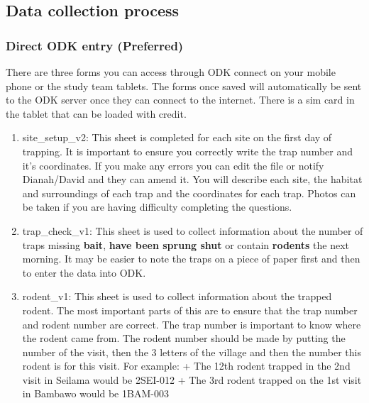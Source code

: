 \documentclass[
]{article}
\providecommand{\tightlist}{%
  \setlength{\itemsep}{0pt}\setlength{\parskip}{0pt}}
\begin{document}
\hypertarget{data-collection-process}{%
\subsection{Data collection process}\label{data-collection-process}}

\hypertarget{direct-odk-entry-preferred}{%
\subsubsection{\texorpdfstring{Direct ODK entry
\textbf{(Preferred)}}{Direct ODK entry (Preferred)}}\label{direct-odk-entry-preferred}}

There are three forms you can access through ODK connect on your mobile
phone or the study team tablets. The forms once saved will automatically
be sent to the ODK server once they can connect to the internet. There
is a sim card in the tablet that can be loaded with credit.

\begin{enumerate}
\def\labelenumi{\arabic{enumi}.}
\tightlist
\item
  site\_setup\_v2: This sheet is completed for each site on the first
  day of trapping. It is important to ensure you correctly write the
  trap number and it's coordinates. If you make any errors you can edit
  the file or notify Dianah/David and they can amend it. You will
  describe each site, the habitat and surroundings of each trap and the
  coordinates for each trap. Photos can be taken if you are having
  difficulty completing the questions.
\item
  trap\_check\_v1: This sheet is used to collect information about the
  number of traps missing \textbf{bait}, \textbf{have been sprung shut}
  or contain \textbf{rodents} the next morning. It may be easier to note
  the traps on a piece of paper first and then to enter the data into
  ODK.
\item
  rodent\_v1: This sheet is used to collect information about the
  trapped rodent. The most important parts of this are to ensure that
  the trap number and rodent number are correct. The trap number is
  important to know where the rodent came from. The rodent number should
  be made by putting the number of the visit, then the 3 letters of the
  village and then the number this rodent is for this visit. For
  example: + The 12th rodent trapped in the 2nd visit in Seilama would
  be 2SEI-012 + The 3rd rodent trapped on the 1st visit in Bambawo would
  be 1BAM-003
\end{enumerate}
\end{document}
